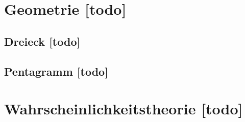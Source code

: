 \begin{comment}
------------------------------------------------------------------------------------------
\end{comment}
\section{Geometrie [todo]}
\subsection{Dreieck [todo]}
\subsection{Pentagramm [todo]}


\begin{comment}
------------------------------------------------------------------------------------------
- Theorie: Wahrscheinlichkeitsverfahren
	- Positionsschätzer in Form einer Wahrscheinlichkeitsverteilung über den Zustandraum.
	- Kalman fitering
		- Multivariate Gaussian distribution (Mehrdimensionale Normalverteilung)
		- \url{https://de.wikipedia.org/wiki/Mehrdimensionale_Normalverteilung}
		- Kompakte Beschreibung der Normalverteilung über den Erwartungswert $\mu$ und die Kovarianzmatrix $\Sigma$ ($\mu$ und $\sigma^2$)
		- \url{https://matheguru.com/stochastik/normalverteilung.html}
	- Markov methods
		- Probability Grid
		- Robot--Position ist diskretisiert
		- Nutzen von Bayes Rule um Grids zu kombinieren/neuerzeugen
	- Monte Carlo Lokalisierung
		- Multimodal Distribution for position estimation
		- Important Sampling
- http://www.mathepedia.de/Stochastik.html
- https://www.youtube.com/watch?v=DoHTsDrzAQk
- http://ais.informatik.uni-freiburg.de/teaching/ss13/robotics/
- https://en.wikipedia.org/wiki/Conditional_dependence
- https://www.mrpt.org/tutorials/slam-algorithms/rangeonly_slam/
\end{comment}
\section{Wahrscheinlichkeitstheorie [todo]}


